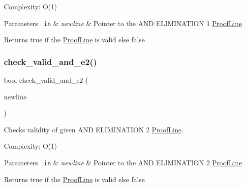 Complexity\+: O(1) 
\begin{DoxyParams}[1]{Parameters}
\mbox{\texttt{ in}}  & {\em newline} & Pointer to the A\+ND E\+L\+I\+M\+I\+N\+A\+T\+I\+ON 1 \mbox{\hyperlink{classProofLine}{Proof\+Line}} \\
\hline
\end{DoxyParams}
\begin{DoxyReturn}{Returns}
true if the \mbox{\hyperlink{classProofLine}{Proof\+Line}} is valid else false 
\end{DoxyReturn}
\mbox{\label{classProofLine_add6d4592664b8ce7ed7e02f8f76a9a2a}} 
\subsubsection{\texorpdfstring{check\+\_\+valid\+\_\+and\+\_\+e2()}{check\_valid\_and\_e2()}}
{\footnotesize\ttfamily bool check\+\_\+valid\+\_\+and\+\_\+e2 (\begin{DoxyParamCaption}\item[{\mbox{\hyperlink{classProofLine}{Proof\+Line}} $\ast$}]{newline }\end{DoxyParamCaption})\hspace{0.3cm}{\ttfamily [related]}}



Checks validity of given A\+ND E\+L\+I\+M\+I\+N\+A\+T\+I\+ON 2 \mbox{\hyperlink{classProofLine}{Proof\+Line}}. 

Complexity\+: O(1) 
\begin{DoxyParams}[1]{Parameters}
\mbox{\texttt{ in}}  & {\em newline} & Pointer to the A\+ND E\+L\+I\+M\+I\+N\+A\+T\+I\+ON 2 \mbox{\hyperlink{classProofLine}{Proof\+Line}} \\
\hline
\end{DoxyParams}
\begin{DoxyReturn}{Returns}
true if the \mbox{\hyperlink{classProofLine}{Proof\+Line}} is valid else false 
\end{DoxyReturn}
\mbox{\label{classProofLine_a2a3a60e30b9b569cacc3e2f1ec08747a}} 
